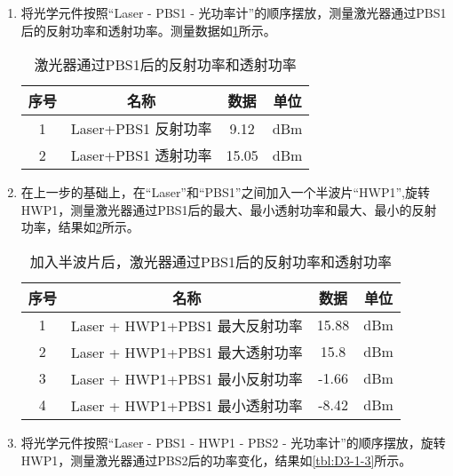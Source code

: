 \documentclass[dvipsnames, svgnames,a4paper,11pt]{article}
\begin{document}
		\begin{enumerate}
			\item 将光学元件按照“Laser - PBS1 - 光功率计”的顺序摆放，测量激光器通过PBS1后的反射功率和透射功率。测量数据如\cref{tbl:D3-1-1}所示。
			
				\begin{table}[htbp]
					\centering
					\begin{tabular}{|c|c|cc|} 
					\hline
					序号 & 名称              & 数据    & 单位   \\ 
					\hline
					1  & Laser+PBS1 反射功率 & 9.12  & dBm  \\
					2  & Laser+PBS1 透射功率 & 15.05 & dBm  \\
					\hline
					\end{tabular}
					\caption{激光器通过PBS1后的反射功率和透射功率}
					\label{tbl:D3-1-1}
				\end{table}


			
			\item 在上一步的基础上，在“Laser”和“PBS1”之间加入一个半波片“HWP1”,旋转HWP1，测量激光器通过PBS1后的最大、最小透射功率和最大、最小的反射功率，结果如\cref{tbl:D3-1-2}所示。
				
				\begin{table}[htbp]
					\centering
					\begin{tabular}{|c|c|cc|} 
					\hline
					序号 & 名称                       & 数据    & 单位   \\ 
					\hline
					1  & Laser + HWP1+PBS1 最大反射功率 & 15.88 & dBm  \\
					2  & Laser + HWP1+PBS1 最大透射功率 & 15.8  & dBm  \\
					3  & Laser + HWP1+PBS1 最小反射功率 & -1.66 & dBm  \\
					4  & Laser + HWP1+PBS1 最小透射功率 & -8.42 & dBm  \\
					\hline
					\end{tabular}
					\caption{加入半波片后，激光器通过PBS1后的反射功率和透射功率}
					\label{tbl:D3-1-2}
				\end{table}
			
			\item 将光学元件按照“Laser - PBS1 - HWP1 - PBS2 - 光功率计”的顺序摆放，旋转HWP1，测量激光器通过PBS2后的功率变化，结果如\cref{tbl:D3-1-3}所示。
			

\end{enumerate}
\end{document}
